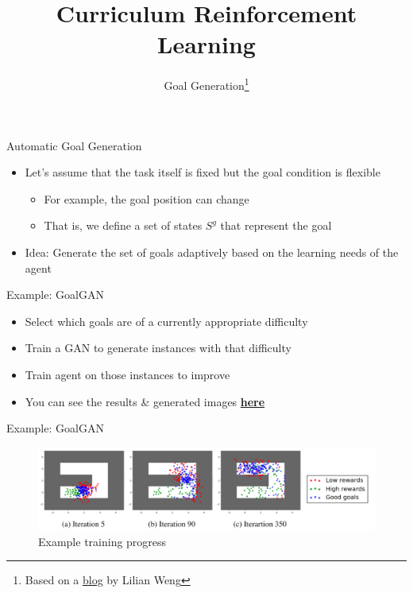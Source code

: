 \documentclass[aspectratio=169]{../latex_main/tntbeamer}  %
\title[Curriculum RL]{Curriculum Reinforcement Learning}
\subtitle{Goal Generation\footnote{Based on a \href{https://lilianweng.github.io/lil-log/2020/01/29/curriculum-for-reinforcement-learning.html}{blog} by Lilian Weng}}
\begin{document}
	
	\maketitle

\begin{frame}[c]{Automatic Goal Generation}
	
	\begin{itemize}
		\item Let's assume that the task itself is fixed but the goal condition is flexible
		\begin{itemize}
			\item For example, the goal position can change
			\item That is, we define a set of states $S^g$ that represent the goal
		\end{itemize}
		\pause
		\smallskip
		\item \alert{Idea:} Generate the set of goals adaptively based on the learning needs of the agent
	\end{itemize}
	
\end{frame}
\begin{frame}[c]{Example: GoalGAN~}
	
	\begin{itemize}
		\item Select which goals are of a currently appropriate difficulty
		\item Train a GAN to generate instances with that difficulty
		\item Train agent on those instances to improve
		\item You can see the results \& generated images \href{https://sites.google.com/view/goalgeneration4rl}{\textbf{here}}
	\end{itemize}
	
\end{frame}
\begin{frame}[c]{Example: GoalGAN~}
	
	\begin{figure}
		\centering
		\includegraphics[scale=0.37]{images/goalgan.png}
		\caption{Example training progress}
	\end{figure}
	
\end{frame}
\end{document}
